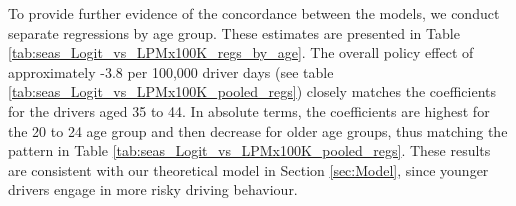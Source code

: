 To provide further evidence of the concordance between the models, 
we conduct separate regressions by age group. 
These estimates are presented in 
Table \ref{tab:seas_Logit_vs_LPMx100K_regs_by_age}. 
The overall policy effect of approximately -3.8 per 100,000 driver days (see table \ref{tab:seas_Logit_vs_LPMx100K_pooled_regs}) 
closely matches the coefficients for the drivers aged 35 to 44. 
In absolute terms, the coefficients are highest for the 20 to 24 age group and then decrease for older age groups, thus
matching the pattern in Table \ref{tab:seas_Logit_vs_LPMx100K_pooled_regs}. 
These results are consistent 
with our theoretical model in Section \ref{sec:Model}, 
since younger drivers engage in more risky driving behaviour. 
